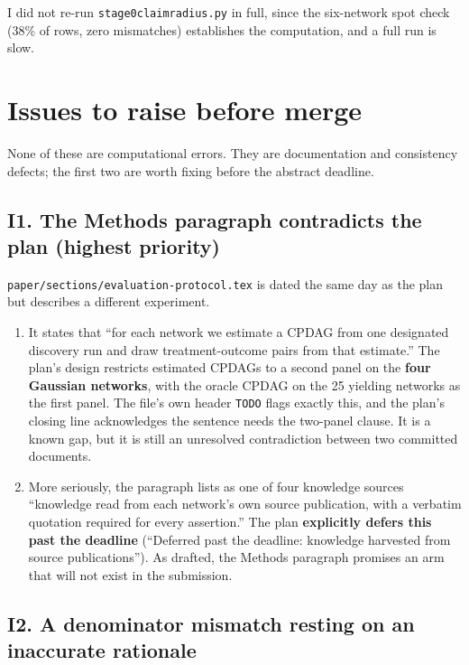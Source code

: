 \documentclass[11pt,a4paper]{article}
\newcommand{\code}[1]{\texttt{\small\hspace{0pt}#1}}
\newcommand{\ul}{\discretionary{\_}{}{\_}}
\begin{document}
I did not re-run \code{stage0\ul claim\ul radius.py} in full, since the six-network spot check
(38\% of rows, zero mismatches) establishes the computation, and a full run is slow.

\section{Issues to raise before merge}
\label{sec:issues}

None of these are computational errors. They are documentation and consistency defects; the first
two are worth fixing before the abstract deadline.

\subsection{I1. The Methods paragraph contradicts the plan (highest priority)}

\code{paper/sections/evaluation-protocol.tex} is dated the same day as the plan but describes a
different experiment.

\begin{enumerate}[leftmargin=1.4em,itemsep=0.2em]
\item It states that ``for each network we estimate a CPDAG from one designated discovery run and
draw treatment-outcome pairs from that estimate.'' The plan's design restricts estimated CPDAGs to
a second panel on the \textbf{four Gaussian networks}, with the oracle CPDAG on the 25 yielding
networks as the first panel. The file's own header \code{TODO} flags exactly this, and the plan's
closing line acknowledges the sentence needs the two-panel clause. It is a known gap, but it is
still an unresolved contradiction between two committed documents.

\item More seriously, the paragraph lists as one of four knowledge sources ``knowledge read from
each network's own source publication, with a verbatim quotation required for every assertion.''
The plan \textbf{explicitly defers this past the deadline} (``Deferred past the deadline: knowledge
harvested from source publications''). As drafted, the Methods paragraph promises an arm that will
not exist in the submission.
\end{enumerate}

\subsection{I2. A denominator mismatch resting on an inaccurate rationale}
\end{document}
